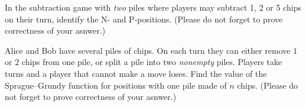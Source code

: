 \documentclass[addpoints]{exam}
\begin{document}
  \pagestyle{headandfoot}
  \runningheadrule

  \firstpagefooter{}{}{}
  \runningfooter{}{}{}
  \begin{flushright}

    \vspace{0.2in}
  \end{flushright}

  \begin{questions}
    \question[10]
      In the subtraction game with \emph{two} piles where players may subtract 1, 2 or
			5 chips on their turn, identify the N- and P-positions.
			(Please do not forget to prove correctness of your asnwer.)

      \begin{solution}[\stretch{1}]
      \end{solution}
      \newpage
    \question[10]
      Alice and Bob have several piles of chips. On each turn they can either
			remove $1$ or $2$ chips from one pile, or split a pile into two \emph{nonempty}
			piles. Players take turns and a player that cannot make a move loses. Find the
			value of the Sprague--Grundy function for positions with one pile made of $n$
			chips.
			(Please do not forget to prove correctness of your asnwer.)

      \begin{solution}[\stretch{1}]
      \end{solution}
      \newpage
  \end{questions}
\end{document}
